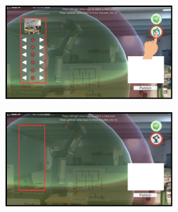 \begin{figure}[h]
    \begin{subfigure}{\textwidth}
        \caption{}
        \centering
        \includegraphics[width=0.7\textwidth]{figs/feature-3.png}
        \label{fig:subfig3}
    \end{subfigure}

    \vspace{0.5em}

    \begin{subfigure}{\textwidth}
        \caption{}
        \centering
        \includegraphics[width=0.7\textwidth]{figs/feature-4.png}
        \label{fig:subfig4}
    \end{subfigure}

    \vspace{0.5em}


\end{figure}
